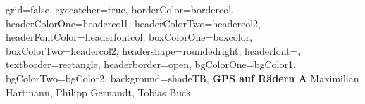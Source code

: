 \documentclass[a0paper,portrait]{baposter}
\begin{document}


\begin{poster}{
	grid=false,
	eyecatcher=true, 
	borderColor=bordercol,
	headerColorOne=headercol1,
	headerColorTwo=headercol2,
	headerFontColor=headerfontcol,
	boxColorOne=boxcolor,
	boxColorTwo=headercol2,
	headershape=roundedright,
	headerfont=\Large\sf\textbf,
	textborder=rectangle,
	headerborder=open,
	bgColorOne=bgColor1,
	bgColorTwo=bgColor2,
	background=shadeTB,
}
{
\setlength\fboxsep{0pt}
\setlength\fboxrule{0.5pt}
}
{
\sf\textbf{\hspace{-4.5em} GPS auf Rädern A}
}
{
	\hspace{-7.5em}
	\vspace{1em} Maximilian Hartmann, Philipp Gernandt, Tobias Buck\\
}
\end{poster}
\end{document}
